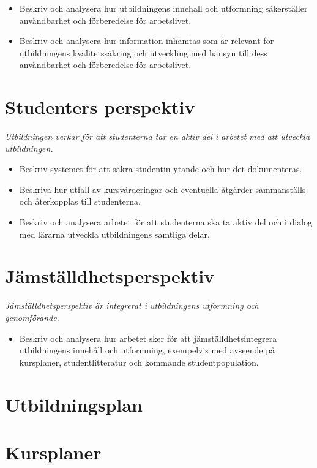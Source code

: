 \documentclass[10pt,article,oneside]{memoir}
\begin{document}
\begin{itemize}  
\item Beskriv och analysera hur utbildningens innehåll och utformning säkerställer användbarhet och förberedelse för arbetslivet.
\item Beskriv och analysera hur information inhämtas som är relevant för utbildningens kvalitetssäkring och utveckling med hänsyn till dess användbarhet och förberedelse för arbetslivet.
\end{itemize}

\section{Studenters perspektiv}

\emph{Utbildningen verkar för att studenterna tar en aktiv del i arbetet med att utveckla utbildningen.}
  
\begin{itemize}  
\item Beskriv systemet för att säkra studentin ytande och hur det dokumenteras.
\item Beskriva hur utfall av kursvärderingar och eventuella åtgärder sammanställs och återkopplas till studenterna.
\item Beskriv och analysera arbetet för att studenterna ska ta aktiv del och i dialog med lärarna utveckla utbildningens samtliga delar.
\end{itemize}  

\section{Jämställdhetsperspektiv}

\emph{Jämställdhetsperspektiv är integrerat i utbildningens utformning och genomförande.}
  
\begin{itemize}  
\item Beskriv och analysera hur arbetet sker för att jämställdhetsintegrera utbildningens innehåll och utformning, exempelvis med avseende på kursplaner, studentlitteratur och kommande studentpopulation.
\end{itemize}  

\section{Utbildningsplan}

\section{Kursplaner}
\end{document}

